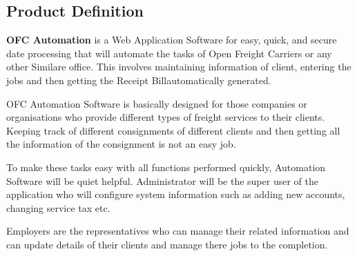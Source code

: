 \subsection{Product Definition}
{\bf OFC Automation} is a Web Application Software for easy, quick, 
and secure date processing that will automate the tasks of Open Freight 
Carriers or any other Similare office. This involves maintaining 
information of client, entering the jobs and then getting the Receipt 
Billautomatically generated.
 
OFC Automation Software is basically designed for those companies or 
organisations who provide different types of freight services to their 
clients. Keeping track of different consignments of different clients 
and then getting all the information of the consignment is not an easy 
job.

To make these tasks easy with all functions performed quickly, Automation 
Software will be quiet helpful. Administrator will be the super user 
of the application who will configure system information such as adding 
new accounts, changing service tax etc. 

Employers are the representatives who can manage their related 
information and can update details of their clients and manage there 
jobs to the completion.




